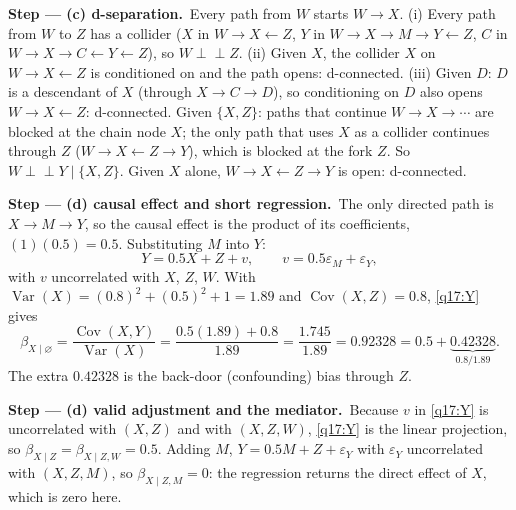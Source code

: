 \documentclass[11pt,a4paper]{article}
\newcommand{\passo}[2]{\par\smallskip\noindent\textbf{Step --- #1.}~#2}
\begin{document}
\begin{sol}
\passo{(c) d-separation}{Every path from $W$ starts $W\to X$.
(i) Every path from $W$ to $Z$ has a collider ($X$ in $W\to X\leftarrow Z$, $Y$ in $W\to X\to M\to Y\leftarrow Z$,
$C$ in $W\to X\to C\leftarrow Y\leftarrow Z$), so $W\perp\!\!\!\perp Z$.
(ii) Given $X$, the collider $X$ on $W\to X\leftarrow Z$ is conditioned on and the path opens: d-connected.
(iii) Given $D$: $D$ is a descendant of $X$ (through $X\to C\to D$), so conditioning on $D$ also opens
$W\to X\leftarrow Z$: d-connected.
Given $\{X,Z\}$: paths that continue $W\to X\to\cdots$ are blocked at the chain node $X$; the only path that
uses $X$ as a collider continues through $Z$ ($W\to X\leftarrow Z\to Y$), which is blocked at the fork $Z$.
So $W\perp\!\!\!\perp Y\mid\{X,Z\}$. Given $X$ alone, $W\to X\leftarrow Z\to Y$ is open: d-connected.}

\passo{(d) causal effect and short regression}{The only directed path is $X\to M\to Y$, so the causal effect
is the product of its coefficients, $(1)(0.5)=0.5$. Substituting $M$ into $Y$:
\begin{equation}
Y=0.5X+Z+v,\qquad v=0.5\varepsilon_M+\varepsilon_Y,\label{q17:Y}
\end{equation}
with $v$ uncorrelated with $X$, $Z$, $W$. With $\operatorname{Var}(X)=(0.8)^2+(0.5)^2+1=1.89$ and
$\operatorname{Cov}(X,Z)=0.8$, \eqref{q17:Y} gives
\begin{equation}
\beta_{X\mid\varnothing}=\frac{\operatorname{Cov}(X,Y)}{\operatorname{Var}(X)}=\frac{0.5(1.89)+0.8}{1.89}=\frac{1.745}{1.89}=0.92328=0.5+\underbrace{0.42328}_{0.8/1.89}.\label{q17:short}
\end{equation}
The extra $0.42328$ is the back-door (confounding) bias through $Z$.}

\passo{(d) valid adjustment and the mediator}{Because $v$ in \eqref{q17:Y} is uncorrelated with $(X,Z)$ and with
$(X,Z,W)$, \eqref{q17:Y} is the linear projection, so $\beta_{X\mid Z}=\beta_{X\mid Z,W}=0.5$. Adding $M$,
$Y=0.5M+Z+\varepsilon_Y$ with $\varepsilon_Y$ uncorrelated with $(X,Z,M)$, so $\beta_{X\mid Z,M}=0$: the
regression returns the direct effect of $X$, which is zero here.}


\end{sol}
\end{document}
